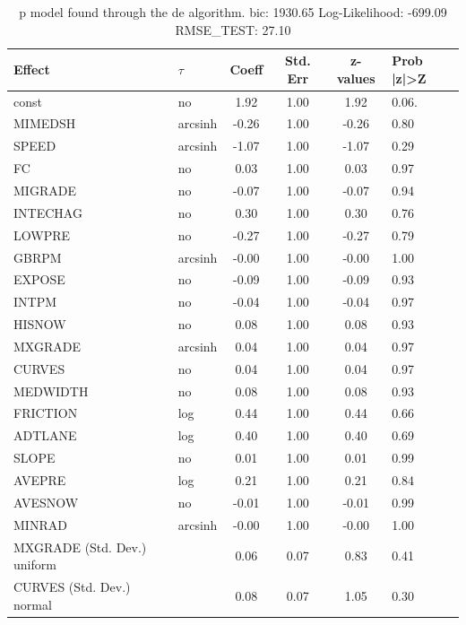 \begin{table}
	\caption{p model found through the de algorithm. bic: 1930.65 Log-Likelihood: -699.09 RMSE_TEST: 27.10}
	\begin{center}
		\begin{tabular}{|l|l|c|c|c|l|}
			\hline
			Effect & $\tau$ & Coeff & Std. Err & z-values & Prob |z|>Z \\
			\hline
			const & no & 1.92 & 1.00 & 1.92 & 0.06. \\
			\hline
			MIMEDSH & arcsinh & -0.26 & 1.00 & -0.26 & 0.80 \\
			\hline
			SPEED & arcsinh & -1.07 & 1.00 & -1.07 & 0.29 \\
			\hline
			FC & no & 0.03 & 1.00 & 0.03 & 0.97 \\
			\hline
			MIGRADE & no & -0.07 & 1.00 & -0.07 & 0.94 \\
			\hline
			INTECHAG & no & 0.30 & 1.00 & 0.30 & 0.76 \\
			\hline
			LOWPRE & no & -0.27 & 1.00 & -0.27 & 0.79 \\
			\hline
			GBRPM & arcsinh & -0.00 & 1.00 & -0.00 & 1.00 \\
			\hline
			EXPOSE & no & -0.09 & 1.00 & -0.09 & 0.93 \\
			\hline
			INTPM & no & -0.04 & 1.00 & -0.04 & 0.97 \\
			\hline
			HISNOW & no & 0.08 & 1.00 & 0.08 & 0.93 \\
			\hline
			MXGRADE & arcsinh & 0.04 & 1.00 & 0.04 & 0.97 \\
			\hline
			CURVES & no & 0.04 & 1.00 & 0.04 & 0.97 \\
			\hline
			MEDWIDTH & no & 0.08 & 1.00 & 0.08 & 0.93 \\
			\hline
			FRICTION & log & 0.44 & 1.00 & 0.44 & 0.66 \\
			\hline
			ADTLANE & log & 0.40 & 1.00 & 0.40 & 0.69 \\
			\hline
			SLOPE & no & 0.01 & 1.00 & 0.01 & 0.99 \\
			\hline
			AVEPRE & log & 0.21 & 1.00 & 0.21 & 0.84 \\
			\hline
			AVESNOW & no & -0.01 & 1.00 & -0.01 & 0.99 \\
			\hline
			MINRAD & arcsinh & -0.00 & 1.00 & -0.00 & 1.00 \\
			\hline
			MXGRADE (Std. Dev.) uniform &  & 0.06 & 0.07 & 0.83 & 0.41 \\
			\hline
			CURVES (Std. Dev.) normal &  & 0.08 & 0.07 & 1.05 & 0.30 \\

\end{tabular}
\end{center}
\end{table}
